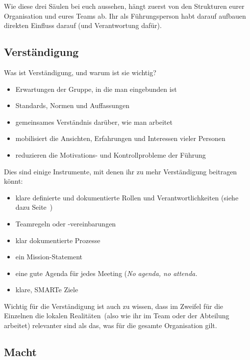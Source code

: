 Wie diese drei Säulen bei euch aussehen, hängt zuerst von den Strukturen eurer Organisation und eures Teams ab. Ihr als Führungsperson habt darauf aufbauen direkten Einfluss darauf (und Verantwortung dafür).


\subsection{Verständigung}

Was ist Verständigung, und warum ist sie wichtig?

\begin{itemize}
  \item Erwartungen der Gruppe, in die man eingebunden ist
  \item Standards, Normen und Auffassungen
  \item gemeinsames Verständnis darüber, wie man arbeitet
  \item mobilisiert die Ansichten, Erfahrungen und Interessen vieler Personen
  \item reduzieren die Motivations- und Kontrollprobleme der Führung
\end{itemize}

Dies sind einige Instrumente, mit denen ihr zu mehr Verständigung beitragen könnt:

\begin{itemize}
  \item klare definierte und dokumentierte Rollen und Verantwortlichkeiten (siehe dazu Seite~\pageref{rollen}) 
  \item Teamregeln oder -vereinbarungen 
  \item klar dokumentierte Prozesse 
  \item ein Mission-Statement 
  \item eine gute Agenda für jedes Meeting (\glqq\emph{No agenda, no attenda.\grqq} 
  \item klare, SMARTe Ziele
\end{itemize}

Wichtig für die Verständigung ist auch zu wissen, dass im Zweifel für die Einzelnen die \glqq lokalen Realitäten\grqq\ (also wie ihr im Team oder der Abteilung arbeitet) relevanter sind als das, was für die gesamte Organisation gilt.


\subsection{Macht}

